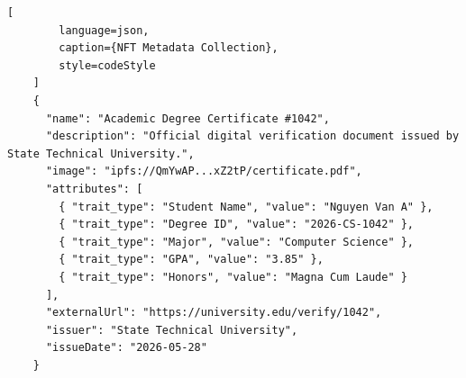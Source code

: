 \begin{lstlisting}[
        language=json, 
        caption={NFT Metadata Collection},
        style=codeStyle
    ]
    {
      "name": "Academic Degree Certificate #1042",
      "description": "Official digital verification document issued by State Technical University.",
      "image": "ipfs://QmYwAP...xZ2tP/certificate.pdf",
      "attributes": [
        { "trait_type": "Student Name", "value": "Nguyen Van A" },
        { "trait_type": "Degree ID", "value": "2026-CS-1042" },
        { "trait_type": "Major", "value": "Computer Science" },
        { "trait_type": "GPA", "value": "3.85" },
        { "trait_type": "Honors", "value": "Magna Cum Laude" }
      ],
      "externalUrl": "https://university.edu/verify/1042",
      "issuer": "State Technical University",
      "issueDate": "2026-05-28"
    }
\end{lstlisting}